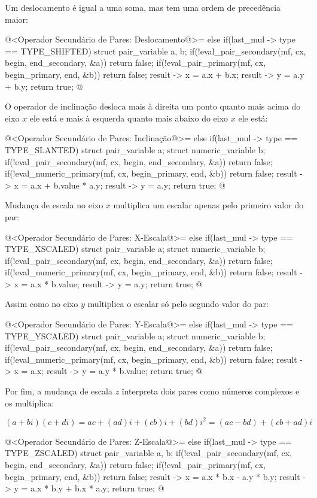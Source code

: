 Um deslocamento é igual a uma soma, mas tem uma ordem de precedência
maior:

\iniciocodigo
@<Operador Secundário de Pares: Deslocamento@>=
else if(last_mul -> type == TYPE_SHIFTED){
  struct pair_variable a, b;
  if(!eval_pair_secondary(mf, cx, begin, end_secondary, &a))
    return false;
  if(!eval_pair_primary(mf, cx, begin_primary, end, &b))
    return false;
  result -> x = a.x + b.x;
  result -> y = a.y + b.y;
  return true;
}
@
\fimcodigo

O operador de inclinação desloca mais à direita um ponto quanto mais
acima do eixo $x$ ele está e mais à esquerda quanto mais abaixo do
eixo $x$ ele está:

\iniciocodigo
@<Operador Secundário de Pares: Inclinação@>=
else if(last_mul -> type == TYPE_SLANTED){
  struct pair_variable a;
  struct numeric_variable b;
  if(!eval_pair_secondary(mf, cx, begin, end_secondary, &a))
    return false;
  if(!eval_numeric_primary(mf, cx, begin_primary, end, &b))
    return false;
  result -> x = a.x + b.value * a.y;
  result -> y = a.y;
  return true;
}
@
\fimcodigo

Mudança de escala no eixo $x$ multiplica um escalar apenas pelo
primeiro valor do par:

\iniciocodigo
@<Operador Secundário de Pares: X-Escala@>=
else if(last_mul -> type == TYPE_XSCALED){
  struct pair_variable a;
  struct numeric_variable b;
  if(!eval_pair_secondary(mf, cx, begin, end_secondary, &a))
    return false;
  if(!eval_numeric_primary(mf, cx, begin_primary, end, &b))
    return false;
  result -> x = a.x * b.value;
  result -> y = a.y;
  return true;
}
@
\fimcodigo

Assim como no eixo $y$ multiplica o escalar só pelo segundo valor do
par:

\iniciocodigo
@<Operador Secundário de Pares: Y-Escala@>=
else if(last_mul -> type == TYPE_YSCALED){
  struct pair_variable a;
  struct numeric_variable b;
  if(!eval_pair_secondary(mf, cx, begin, end_secondary, &a))
    return false;
  if(!eval_numeric_primary(mf, cx, begin_primary, end, &b))
    return false;
  result -> x = a.x;
  result -> y = a.y * b.value;
  return true;
}
@
\fimcodigo

Por fim, a mudança de escala $z$ înterpreta dois pares como números
complexos e os multiplica:

$$
(a+bi)(c+di) = ac + (ad)i + (cb)i + (bd)i^2 = (ac - bd) + (cb+ad)i
$$

\iniciocodigo
@<Operador Secundário de Pares: Z-Escala@>=
else if(last_mul -> type == TYPE_ZSCALED){
  struct pair_variable a, b;
  if(!eval_pair_secondary(mf, cx, begin, end_secondary, &a))
    return false;
  if(!eval_pair_primary(mf, cx, begin_primary, end, &b))
    return false;
  result -> x = a.x * b.x - a.y * b.y;
  result -> y = a.x * b.y + b.x * a.y;
  return true;
}
@
\fimcodigo

